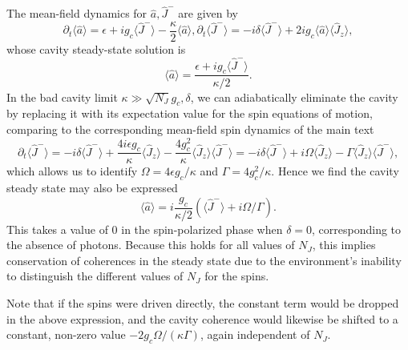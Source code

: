 \documentclass[11pt]{article}
\begin{document}
The mean-field dynamics for $\hat a, \hat J^-$ are given by
\begin{subequations}
\begin{equation}
    \partial_t \langle \hat a \rangle  =  \epsilon + i g_c \langle \hat J^-\rangle  - \frac{\kappa}{2} \langle \hat a\rangle,
\end{equation}
\begin{equation}
    \partial_t \langle \hat J^- \rangle = - i \delta \langle \hat J^- \rangle + 2i g_c \langle \hat a \rangle \langle \hat J_z \rangle,
\end{equation}
\end{subequations}
whose cavity steady-state solution is
\begin{equation}
     \langle \hat a\rangle = \frac{\epsilon + i g_c \langle \hat J^- \rangle}{\kappa/2}.
\end{equation}
In the bad cavity limit $\kappa \gg \sqrt{N_J}g_c, \delta$, we can adiabatically eliminate the cavity by replacing it with its expectation value for the spin equations of motion, comparing to the corresponding mean-field spin dynamics of the main text
\begin{equation}
    \partial_t \langle \hat J^- \rangle
    =
    - i \delta \langle \hat J^- \rangle
    + \frac{4 i \epsilon g_c}{\kappa} \langle \hat J_z \rangle
    - \frac{4 g_c^2}{\kappa} \langle \hat J_z \rangle \langle \hat J^- \rangle
    =
    - i \delta \langle \hat J^- \rangle
    + i \Omega \langle \hat J_z \rangle
    - \Gamma \langle \hat J_z \rangle \langle \hat J^- \rangle,
\end{equation}
which allows us to identify $\Omega = 4 \epsilon g_c/\kappa$ and $\Gamma = 4g_c^2/\kappa$. Hence we find the cavity steady state may also be expressed
\begin{equation}
\label{eq:aMF}
    \langle \hat a \rangle = i \frac{g_c}{\kappa/2}(\langle \hat J^-\rangle + i\Omega/\Gamma).
\end{equation}
This takes a value of 0 in the spin-polarized phase when $\delta = 0$, corresponding to the absence of photons. Because this holds for all values of $N_J$, this implies conservation of coherences in the steady state due to the environment's inability to distinguish the different values of $N_J$ for the spins.

Note that if the spins were driven directly, the constant term would be dropped in the above expression, and the cavity coherence would likewise be shifted to a constant, non-zero value $-2 g_c \Omega/(\kappa \Gamma)$, again independent of $N_J$.
\end{document}
